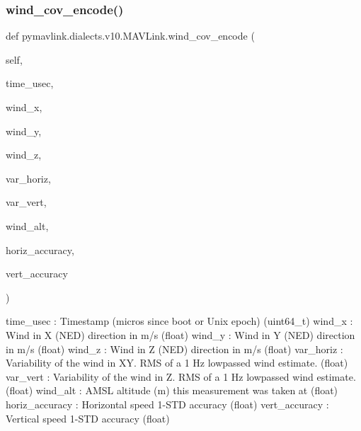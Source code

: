 \begin{DoxyVerb}
\begin{DoxyVerb}
\begin{DoxyVerb}
\begin{DoxyVerb}
\begin{DoxyVerb}
\begin{DoxyVerb}
\begin{DoxyVerb}
\begin{DoxyVerb}
\begin{DoxyVerb}
\begin{DoxyVerb}
\subsubsection{\texorpdfstring{wind\+\_\+cov\+\_\+encode()}{wind\_cov\_encode()}}
{\footnotesize\ttfamily def pymavlink.\+dialects.\+v10.\+M\+A\+V\+Link.\+wind\+\_\+cov\+\_\+encode (\begin{DoxyParamCaption}\item[{}]{self,  }\item[{}]{time\+\_\+usec,  }\item[{}]{wind\+\_\+x,  }\item[{}]{wind\+\_\+y,  }\item[{}]{wind\+\_\+z,  }\item[{}]{var\+\_\+horiz,  }\item[{}]{var\+\_\+vert,  }\item[{}]{wind\+\_\+alt,  }\item[{}]{horiz\+\_\+accuracy,  }\item[{}]{vert\+\_\+accuracy }\end{DoxyParamCaption})}

\begin{DoxyVerb}time_usec                 : Timestamp (micros since boot or Unix epoch) (uint64_t)
wind_x                    : Wind in X (NED) direction in m/s (float)
wind_y                    : Wind in Y (NED) direction in m/s (float)
wind_z                    : Wind in Z (NED) direction in m/s (float)
var_horiz                 : Variability of the wind in XY. RMS of a 1 Hz lowpassed wind estimate. (float)
var_vert                  : Variability of the wind in Z. RMS of a 1 Hz lowpassed wind estimate. (float)
wind_alt                  : AMSL altitude (m) this measurement was taken at (float)
horiz_accuracy            : Horizontal speed 1-STD accuracy (float)
vert_accuracy             : Vertical speed 1-STD accuracy (float)\end{DoxyVerb}
 \mbox{\label{classpymavlink_1_1dialects_1_1v10_1_1MAVLink_ad8ddd7b9c248fec335bcdc69b0d91c06}} 

\end{DoxyVerb}
\end{DoxyVerb}
\end{DoxyVerb}
\end{DoxyVerb}
\end{DoxyVerb}
\end{DoxyVerb}
\end{DoxyVerb}
\end{DoxyVerb}
\end{DoxyVerb}
\end{DoxyVerb}
